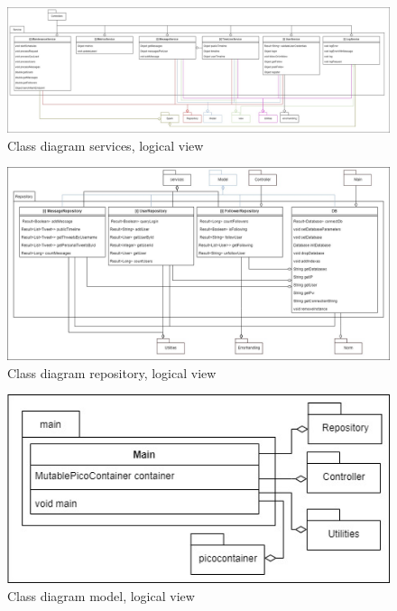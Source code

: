 \begin{figure}[H]
    \centering
    \includegraphics[width=1.0\textwidth]{images/class_diagram_services.jpg}
    \caption{Class diagram services, logical view}
    \label{fig:classDiagramServices}
\end{figure}

\begin{figure}[H]
    \centering
    \includegraphics[width=1.0\textwidth]{images/class_diagram_repository.jpg}
    \caption{Class diagram repository, logical view}
    \label{fig:classDiagramRepository}
\end{figure}
\begin{figure}[H]
    \centering
    \includegraphics[width=1.0\textwidth]{images/class_diagram_model.jpg}
    \caption{Class diagram model, logical view}
    \label{fig:classDiagramModel}
\end{figure}

